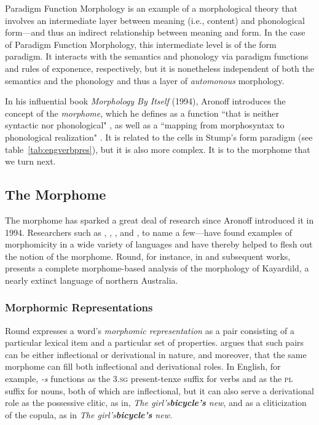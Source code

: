 Paradigm Function Morphology is an example of a morphological theory that involves an intermediate layer between
meaning (i.e., content) and phonological form---and thus an indirect relationship between
meaning and form. In the case of Paradigm Function Morphology, this intermediate
level is of the form paradigm. It interacts with the semantics and phonology 
via paradigm functions and rules of exponence, respectively,
but it is nonetheless independent of both the semantics and the phonology and thus a layer of \emph{automonous} morphology.  

In his influential book \textit{Morphology By Itself} (1994), Aronoff 
introduces the concept of the \emph{morphome}, which he
defines as a function ``that is neither 
syntactic nor phonological" \cite[][p. 25]{aronoff:1994},
as well as a
``mapping from morphosyntax to phonological realization" \citep[][p. 25]{aronoff:1994}. 
It is related
to the cells in Stump's form paradigm (see table~\ref{tab:engverbpres}), 
but it is also more complex. It is to the morphome that we turn next.

\subsection{The Morphome}
\label{sec:the-morphome}
The morphome has sparked a 
great deal of research since Aronoff introduced it in 1994. Researchers
such as \cite{maiden:2005, maiden:md:2016}, \cite{round:2009, round:2011, 
round:2012, round:2015, round:md:2016}, \cite{oneill:2014b,oneill:2018}, and \cite{bonami:2008, bonami:2010}, to name 
a few---have found examples of morphomicity in a wide variety of 
languages and have thereby helped to flesh out the notion of the morphome.
Round, for instance, in \cite{round:2009} and subsequent works, 
presents a complete morphome-based analysis of the morphology of 
Kayardild, a nearly extinct language of northern Australia. 

\subsubsection{Morphormic Representations}
Round expresses a word's \emph{morphomic representation} as a pair 
consisting of a particular lexical item and a particular set of properties.
\cite{round:2011} argues that such pairs can be either inflectional 
 or derivational in nature, and moreover, that the same morphome can fill 
 both inflectional and derivational roles. In English, for example, \emph{-s} 
functions as the \textsc{3.sg} present-tenxe suffix for verbs and as the \textsc{pl} 
 suffix for nouns, both of which are inflectional, but it can also serve a derivational 
 role as the possessive clitic, as in, \emph{The girl's\textbf{bicycle's} new}, and as a
 cliticization of the copula, as in \emph{The girl's\textbf{bicycle's} new.}

